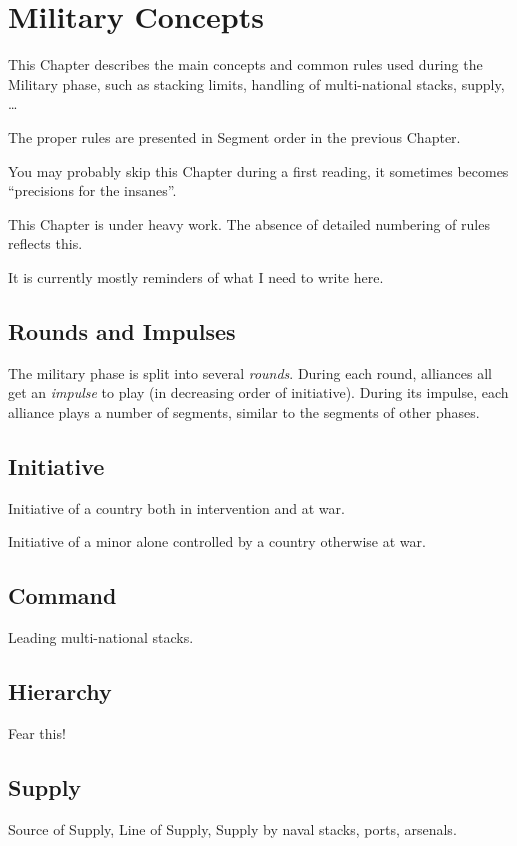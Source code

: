 
\chapter{Military Concepts}\label{chapter:MilitaryConcepts}

\begin{designnote}
  This Chapter describes the main concepts and common rules used
  during the Military phase, such as stacking limits, handling of
  multi-national stacks, supply, \ldots

  The proper rules are presented in Segment order in the previous
  Chapter.

  You may probably skip this Chapter during a first reading, it sometimes
  becomes ``precisions for the insanes''.
\end{designnote}

\begin{todo}
  This Chapter is under heavy work. The absence of detailed numbering of rules
  reflects this.

  It is currently mostly reminders of what I need to write here.
\end{todo}

\section{Rounds and Impulses}
The military phase is split into several \emph{rounds}. During each round,
alliances all get an \emph{impulse} to play (in decreasing order of
initiative). During its impulse, each alliance plays a number of segments,
similar to the segments of other phases.

\section{Initiative}
Initiative of a country both in intervention and at war.

Initiative of a minor alone controlled by a country otherwise at war.

\section{Command}
Leading multi-national stacks.

\section{Hierarchy}
Fear this!

\section{Supply}
Source of Supply, Line of Supply, Supply by naval stacks, ports, arsenals.

